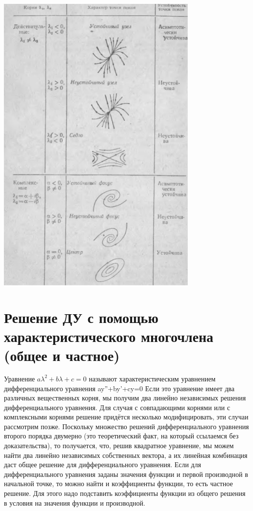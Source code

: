 \documentclass[12pt]{article}
\begin{document}
\includegraphics[width=100mm]{graphics/31_de_2.png}

\section{ Решение ДУ с помощью характеристического многочлена (общее и частное)}
Уравнение $a\lambda^2+b\lambda+c=0$ называют характеристическим уравнением дифференциального уравнения ay''+by'+cy=0 Если это уравнение имеет два различных вещественных корня, мы получим
два линейно независимых решения дифференциального уравнения. Для случая с совпадающими корнями
или с комплексными корнями решение придётся несколько модифицировать, эти случаи рассмотрим позже.
Поскольку множество решений дифференциального уравнения второго порядка двумерно (это
теоретический факт, на который ссылаемся без доказательства), то получается, что, решив квадратное
уравнение, мы можем найти два линейно независимых собственных вектора, а их линейная комбинация
даст общее решение для дифференциального уравнения.
Если для дифференциального уравнения заданы значения функции и первой производной в начальной
точке, то можно найти и коэффициенты функции, то есть частное решение. Для этого надо подставить
коэффициенты функции из общего решения в условия на значения функции и производной.
\end{document}
